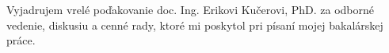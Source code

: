 Vyjadrujem vrelé poďakovanie doc. Ing. Erikovi Kučerovi, PhD. za odborné vedenie, diskusiu a cenné rady, ktoré mi poskytol pri písaní mojej bakalárskej práce.